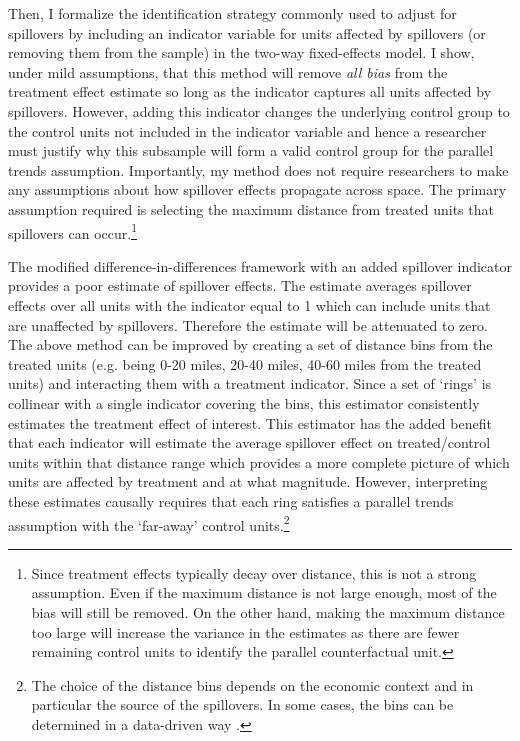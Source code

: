 \documentclass[11pt]{article}
\begin{document}
Then, I formalize the identification strategy commonly used to adjust for spillovers by including an indicator variable for units affected by spillovers (or removing them from the sample) in the two-way fixed-effects model. I show, under mild assumptions, that this method will remove \emph{all bias} from the treatment effect estimate so long as the indicator captures all units affected by spillovers. However, adding this indicator changes the underlying control group to the control units not included in the indicator variable and hence a researcher must justify why this subsample will form a valid control group for the parallel trends assumption. Importantly, my method does not require researchers to make any assumptions about how spillover effects propagate across space. The primary assumption required is selecting the maximum distance from treated units that spillovers can occur.\footnote{Since treatment effects typically decay over distance, this is not a strong assumption. Even if the maximum distance is not large enough, most of the bias will still be removed. On the other hand, making the maximum distance too large will increase the variance in the estimates as there are fewer remaining control units to identify the parallel counterfactual unit.} 

The modified difference-in-differences framework with an added spillover indicator provides a poor estimate of spillover effects. The estimate averages spillover effects over all units with the indicator equal to 1 which can include units that are unaffected by spillovers. Therefore the estimate will be attenuated to zero. The above method can be improved by creating a set of distance bins from the treated units (e.g. being 0-20 miles, 20-40 miles, 40-60 miles from the treated units) and interacting them with a treatment indicator. Since a set of `rings' is collinear with a single indicator covering the bins, this estimator consistently estimates the treatment effect of interest. This estimator has the added benefit that each indicator will estimate the average spillover effect on treated/control units within that distance range which provides a more complete picture of which units are affected by treatment and at what magnitude. However, interpreting these estimates causally requires that each ring satisfies a parallel trends assumption with the `far-away' control units.\footnote{The choice of the distance bins depends on the economic context and in particular the source of the spillovers. In some cases, the bins can be determined in a data-driven way \citep{Butts_2021}.}
\end{document}
